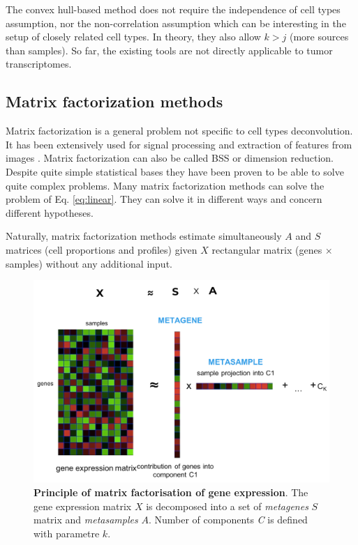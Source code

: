 \documentclass[12pt,]{book}
\theoremstyle{definition}
\theoremstyle{definition}
\theoremstyle{definition}
\theoremstyle{remark}
\begin{document}
The convex hull-based method does not require the independence of cell
types assumption, nor the non-correlation assumption which can be
interesting in the setup of closely related cell types. In theory, they
also allow \(k>j\) (more sources than samples). So far, the existing
tools are not directly applicable to tumor transcriptomes.

\hypertarget{matrix-factorization-methods}{%
\subsection{Matrix factorization
methods}\label{matrix-factorization-methods}}

Matrix factorization is a general problem not specific to cell types
deconvolution. It has been extensively used for signal processing
\citep{Zinovyev2013}and extraction of features from images
\citep{Hastie2009}. Matrix factorization can also be called BSS or
dimension reduction. Despite quite simple statistical bases they have
been proven to be able to solve quite complex problems. Many matrix
factorization methods can solve the problem of Eq. \eqref{eq:linear}. They
can solve it in different ways and concern different hypotheses.

Naturally, matrix factorization methods estimate simultaneously \(A\)
and \(S\) matrices (cell proportions and profiles) given \(X\)
rectangular matrix (genes \(\times\) samples) without any additional
input.

\begin{figure}

{\centering \includegraphics[width=1\linewidth]{figures-ext/factor} 

}

\caption[Principle of matrix factorisation of gene expression]{\textbf{Principle of matrix factorisation of gene
expression}. The gene expression matrix \(X\) is decomposed into a set
of \emph{metagenes} \(S\) matrix and \emph{metasamples} \(A\). Number of
components \emph{C} is defined with parametre \(k\).}\label{fig:fact}
\end{figure}
\end{document}
